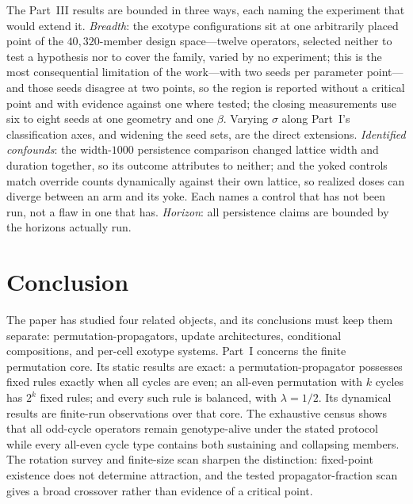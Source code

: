 \documentclass[man,12pt,floatsintext,donotrepeattitle]{apa7}
\newcommand{\sig}{\sigma}
\begin{document}
The Part~III results are bounded in three ways, each naming the experiment
that would extend it. \emph{Breadth}: the exotype
configurations sit at one arbitrarily placed point of the $40{,}320$-member
design space---twelve operators, selected neither to test a hypothesis nor to
cover the family, varied by no experiment; this is the most consequential
limitation of the work---with two seeds per parameter point---and those seeds disagree at two
points, so the region is reported without a critical point and with evidence
against one where tested; the closing measurements use six to eight seeds at
one geometry and one $\beta$. Varying $\sig$ along Part~I's classification
axes, and widening the seed sets, are the direct extensions.
\emph{Identified confounds}: the width-$1000$ persistence comparison changed
lattice width and duration together, so its outcome attributes to neither;
and the yoked
controls match override counts dynamically against their own lattice, so
realized doses can diverge between an arm and its yoke. Each names a control
that has not been run, not a flaw in one that has. \emph{Horizon}: all
persistence claims are bounded by the horizons actually run.

\section{Conclusion}
\label{sec:conclusion}

The paper has studied four related objects, and its conclusions must keep them
separate: permutation-propagators, update architectures, conditional compositions, and
per-cell exotype systems. Part~I concerns the finite permutation core. Its static results are
exact: a permutation-propagator possesses fixed rules exactly when all cycles
are even; an all-even permutation with $k$ cycles has $2^k$ fixed rules; and
every such rule is balanced, with $\lambda=1/2$. Its dynamical results are
finite-run observations over that core. The exhaustive census shows that all
odd-cycle operators remain genotype-alive under the stated protocol while
every all-even cycle type contains both sustaining and collapsing members. The
rotation survey and finite-size scan sharpen the distinction: fixed-point
existence does not determine attraction, and the tested propagator-fraction
scan gives a broad crossover rather than evidence of a critical point.
\end{document}
